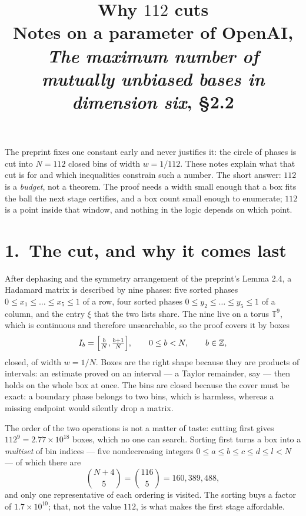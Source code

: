 \documentclass[11pt]{article}
\title{\bfseries Why $112$ cuts\\[6pt]
\large\normalfont Notes on a parameter of OpenAI, \emph{The maximum number of\\[1pt]
mutually unbiased bases in dimension six}, \S2.2}
\author{}
\date{}
\newcommand{\T}{\mathbb{T}}
\begin{document}
\maketitle
\vspace{-2.2em}

\noindent
The preprint fixes one constant early and never justifies it: the circle of phases is cut into
$N=112$ closed bins of width $w=1/112$. These notes explain what that cut is for and which
inequalities constrain such a number. The short answer: $112$ is a \emph{budget}, not a theorem. The
proof needs a width small enough that a box fits the ball the next stage certifies, and a box count
small enough to enumerate; $112$ is a point inside that window, and nothing in the logic depends on
which point.

\section*{1.\ The cut, and why it comes last}

After dephasing and the symmetry arrangement of the preprint's Lemma 2.4, a Hadamard matrix is
described by nine phases: five sorted phases $0\le x_1\le\dots\le x_5\le 1$ of a row, four sorted
phases $0\le y_2\le\dots\le y_5\le1$ of a column, and the entry $\xi$ that the two lists share. The
nine live on a torus $\T^9$, which is continuous and therefore unsearchable, so the proof covers it
by boxes
\[
I_b=\Bigl[\tfrac{b}{N},\tfrac{b+1}{N}\Bigr],\qquad 0\le b<N,\qquad b\in\mathbb Z,
\]
closed, of width $w=1/N$. Boxes are the right shape because they are products of intervals: an
estimate proved on an interval --- a Taylor remainder, say --- then holds on the whole box at once.
The bins are closed because the cover must be exact: a boundary phase belongs to two bins, which is
harmless, whereas a missing endpoint would silently drop a matrix.

The order of the two operations is not a matter of taste: cutting first gives
$112^9=2.77\times 10^{18}$ boxes, which no one can search. Sorting first turns a box into a
\emph{multiset} of bin indices --- five nondecreasing integers $0\le a\le b\le c\le d\le l<N$ ---
of which there are
\begin{equation}\label{eq:count}
\binom{N+4}{5}=\binom{116}{5}=160{,}389{,}488 ,
\end{equation}
and only one representative of each ordering is visited. The sorting buys a factor of
$1.7\times10^{10}$; that, not the value $112$, is what makes the first stage affordable.
\end{document}
